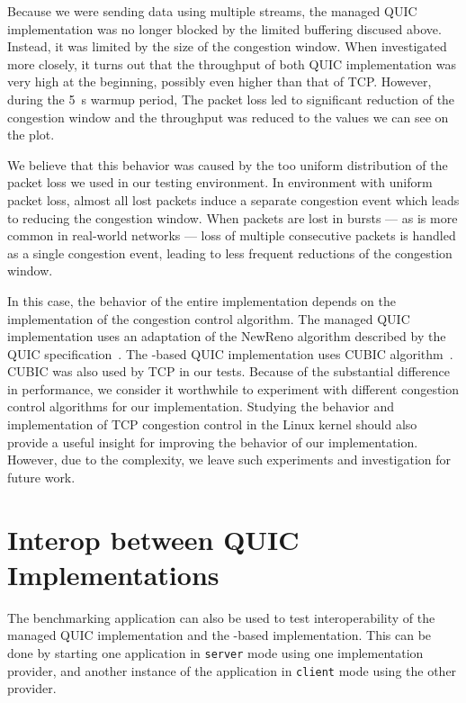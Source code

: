 Because we were sending data using multiple streams, the managed QUIC implementation was no longer
blocked by the limited buffering discused above. Instead, it was limited by the size of the
congestion window. When investigated more closely, it turns out that the throughput of both QUIC
implementation was very high at the beginning, possibly even higher than that of TCP\@. However,
during the \SI{5}{\second} warmup period, The packet loss led to significant reduction of the
congestion window and the throughput was reduced to the values we can see on the plot.

We believe that this behavior was caused by the too uniform distribution of the packet loss we used
in our testing environment. In environment with uniform packet loss, almost all lost packets induce
a separate congestion event which leads to reducing the congestion window. When packets are lost in
bursts --- as is more common in real-world networks --- loss of multiple consecutive packets is handled
as a single congestion event, leading to less frequent reductions of the congestion window.

In this case, the behavior of the entire implementation depends on the implementation of the
congestion control algorithm. The managed QUIC implementation uses an adaptation of the NewReno
algorithm described by the QUIC specification~\autocite[Section~7]{draft-ietf-quic-recovery}. The
\libmsquic{}-based QUIC implementation uses CUBIC algorithm~\cite{rfc8312}. CUBIC was also used by
TCP in our tests. Because of the substantial difference in performance, we consider it worthwhile to
experiment with different congestion control algorithms for our implementation. Studying the
behavior and implementation of TCP congestion control in the Linux kernel should also provide a
useful insight for improving the behavior of our implementation. However, due to the complexity, we
leave such experiments and investigation for future work.

\section{Interop between QUIC Implementations}

The benchmarking application can also be used to test interoperability of the managed QUIC
implementation and the \libmsquic{}-based implementation. This can be done by starting one
application in \texttt{server} mode using one implementation provider, and another instance of the
application in \texttt{client} mode using the other provider.

